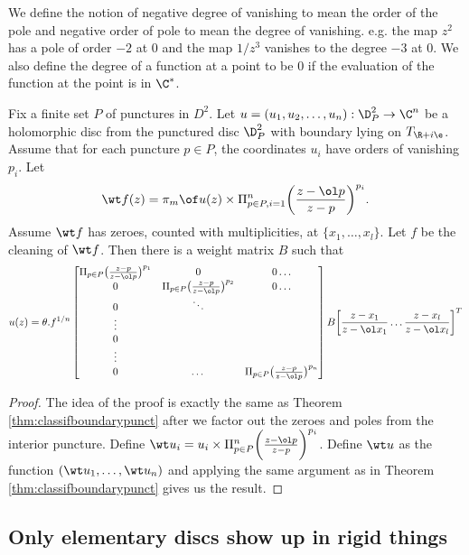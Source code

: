We define the notion of negative degree of vanishing to mean the order of the pole and negative order of pole to mean the degree of vanishing. e.g. the map $z^2$ has a pole of order $-2$ at $0$ and the map $1/z^3$ vanishes to the degree $-3$ at $0$.  We also define the degree of a function at a point to be $0$ if the evaluation of the function at the point is in $\C^*$. 

\begin{Theorem} \label{thm:interiorpunctclass}
        Fix a finite set $P$ of punctures in $D^2$. Let $u=(u_1,u_2,\dots,u_n):\D^2_{P} \to \C^n$ be a holomorphic disc from the punctured disc $\D^2_{P}$ with boundary lying on $T_{\R+i\e}$. Assume that for each puncture $p\in P$, the coordinates $u_i$ have orders of vanishing $p_i$. Let $$\wt f(z)= \pi_m \of u(z) \times \Pi_{p\in P,i=1}^n \bigg(\frac{z-\ol p}{z - p}\bigg)^{p_i}.$$ Assume $\wt f$ has zeroes, counted with multiplicities, at $\{ x_1,\dots ,x_l\}$. Let $f$ be the cleaning of $\wt f$. Then there is a weight matrix $B$ such that $$u(z) = \theta. f^{1/n} \begin{bmatrix}
\Pi_{p\in P} \big(\frac{z-p}{z-\ol p} \big)^{p_1} & 0 & 0 \dots \\
0 & \Pi_{p\in P} \big(\frac{z-p}{z-\ol p} \big)^{p_2}  & 0 \dots \\
0 & \ddots \\
\vdots  \\ 
0  \\
\vdots \\
0 & \dots & \Pi_{p\in P} \big(\frac{z-p}{z-\ol p} \big)^{p_n}  \\ 
\end{bmatrix} 
B \bigg[ \frac{z-x_1}{z-\ol x_1} \dots \frac{z-x_l}{z-\ol x_l} \bigg ] ^T
$$
\end{Theorem}

\begin{proof}
    The idea of the proof is exactly the same as Theorem \ref{thm:classifboundarypunct} after we factor out the zeroes and poles from the interior puncture. Define $\wt u_i = u_i \times  \Pi_{p\in P}^n \bigg(\frac{z-\ol p}{z - p}\bigg)^{p_i} $. Define $\wt u$ as the function $(\wt u_1, \dots , \wt u_n)$ and applying the same argument as in Theorem \ref{thm:classifboundarypunct} gives us the result.
\end{proof}


\subsection{Only elementary discs show up in rigid things}

